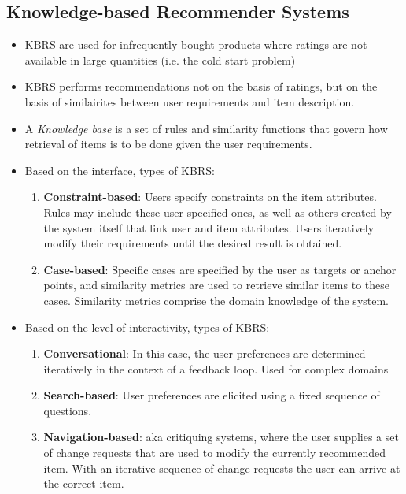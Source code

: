 \documentclass{article}
\begin{document}
\subsection{Knowledge-based Recommender Systems}
\begin{itemize}
    \item KBRS are used for infrequently bought products where ratings are not available in large quantities (i.e. the cold start problem)
    
    \item KBRS performs recommendations not on the basis of ratings, but on the basis of similairites between user requirements and item description. 
    
    \item A \textit{Knowledge base} is a set of rules and similarity functions that govern how retrieval of items is to be done given the user requirements. 
    
    \item Based on the interface, types of KBRS:
    \begin{enumerate}
        \item \textbf{Constraint-based}: Users specify constraints on the item attributes. Rules may include these user-specified ones, as well as others created by the system itself that link user and item attributes. Users iteratively modify their requirements until the desired result is obtained.
        
        \item \textbf{Case-based}: Specific cases are specified by the user as targets or anchor points, and similarity metrics are used to retrieve similar items to these cases. Similarity metrics comprise the domain knowledge of the system.
    \end{enumerate}
    
    \item Based on the level of interactivity, types of KBRS:
    \begin{enumerate}
        \item \textbf{Conversational}: In this case, the user preferences are determined iteratively in the context of a feedback loop. Used for complex domains
        
        \item \textbf{Search-based}: User preferences are elicited using a fixed sequence of questions. 
        
        \item \textbf{Navigation-based}: aka critiquing systems, where the user supplies a set of change requests that are used to modify the currently recommended item. With an iterative sequence of change requests the user can arrive at the correct item. 
    \end{enumerate}
\end{itemize}
\end{document}
